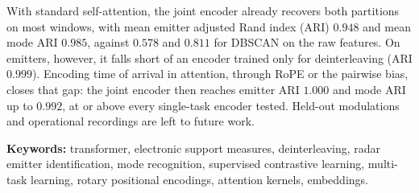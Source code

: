 With standard self-attention, the joint encoder already recovers both partitions on most windows, with mean emitter adjusted Rand index (ARI) $0.948$ and mean mode ARI $0.985$, against $0.578$ and $0.811$ for DBSCAN on the raw features.
On emitters, however, it falls short of an encoder trained only for deinterleaving (ARI $0.999$).
Encoding time of arrival in attention, through RoPE or the pairwise bias, closes that gap: the joint encoder then reaches emitter ARI $1.000$ and mode ARI up to $0.992$, at or above every single-task encoder tested.
Held-out modulations and operational recordings are left to future work.

\vspace{1em}
\noindent\textbf{Keywords:} transformer, electronic support measures, deinterleaving, radar emitter identification, mode recognition, supervised contrastive learning, multi-task learning, rotary positional encodings, attention kernels, embeddings.
